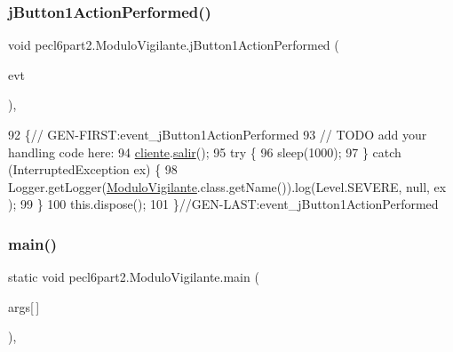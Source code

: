 \subsubsection{\texorpdfstring{j\+Button1\+Action\+Performed()}{jButton1ActionPerformed()}}
{\footnotesize\ttfamily void pecl6part2.\+Modulo\+Vigilante.\+j\+Button1\+Action\+Performed (\begin{DoxyParamCaption}\item[{java.\+awt.\+event.\+Action\+Event}]{evt }\end{DoxyParamCaption})\hspace{0.3cm}{\ttfamily [inline]}, {\ttfamily [private]}}


\begin{DoxyCode}
92                                                                          \{\textcolor{comment}{//
      GEN-FIRST:event\_jButton1ActionPerformed}
93         \textcolor{comment}{// TODO add your handling code here:}
94         \mbox{\hyperlink{classpecl6part2_1_1_modulo_vigilante_a1eeb1ecf2825987aa4aee43982b788e7}{cliente}}.\mbox{\hyperlink{classpecl6part2_1_1_cliente_vigilante_a7d843ed5f4b8e8b1d9c12b45f6a75000}{salir}}();
95             \textcolor{keywordflow}{try} \{
96                 sleep(1000);
97             \} \textcolor{keywordflow}{catch} (InterruptedException ex) \{
98                 Logger.getLogger(\mbox{\hyperlink{classpecl6part2_1_1_modulo_vigilante_a1ae677df7d37e3ef8303a33e80513d0f}{ModuloVigilante}}.class.getName()).log(Level.SEVERE, null, ex
      );
99             \}
100         this.dispose();
101     \}\textcolor{comment}{//GEN-LAST:event\_jButton1ActionPerformed}
\end{DoxyCode}
\mbox{\label{classpecl6part2_1_1_modulo_vigilante_aee9b63050996c952ce471075bfbc9e60}} 
\subsubsection{\texorpdfstring{main()}{main()}}
{\footnotesize\ttfamily static void pecl6part2.\+Modulo\+Vigilante.\+main (\begin{DoxyParamCaption}\item[{String}]{args\mbox{[}$\,$\mbox{]} }\end{DoxyParamCaption})\hspace{0.3cm}{\ttfamily [inline]}, {\ttfamily [static]}}


